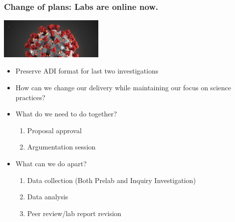 \documentclass[aspectratio=169]{beamer}
\begin{document}
\begin{frame}
\begin{center}
\end{center}
\end{frame}

\begin{frame}
\frametitle{Change of plans: Labs are online now.}
\begin{center}
\includegraphics[width=2in]{coronavirus.jpg}
\end{center}
\begin{itemize}
\item<1-> Preserve ADI format for last two investigations
\item<2-> How can we change our delivery while maintaining our focus on science practices?
\item<3-> What do we need to do together?
\begin{enumerate}
\item Proposal approval
\item Argumentation session
\end{enumerate}
\item<4-> What can we do apart?
\begin{enumerate}
\item Data collection (Both Prelab and Inquiry Investigation)
\item Data analysis
\item Peer review/lab report revision
\end{enumerate}
\end{itemize}
\end{frame}
\end{document}
